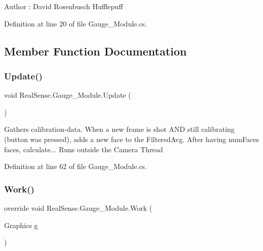 \begin{DoxyAuthor}{Author}
\+: David Rosenbusch  Hufflepuff 
\end{DoxyAuthor}


Definition at line 20 of file Gauge\+\_\+\+Module.\+cs.



\subsection{Member Function Documentation}
\mbox{\label{class_real_sense_1_1_gauge___module_a367111d614ea2a05af81e93a3b957cd4}} 
\subsubsection{\texorpdfstring{Update()}{Update()}}
{\footnotesize\ttfamily void Real\+Sense.\+Gauge\+\_\+\+Module.\+Update (\begin{DoxyParamCaption}{ }\end{DoxyParamCaption})}

Gathers calibration-\/data. When a new frame is shot A\+ND still calibrating (button was pressed), adds a new face to the Filtered\+Avg. After having num\+Faces faces, calculate... Runs outside the Camera Thread 

Definition at line 62 of file Gauge\+\_\+\+Module.\+cs.

\mbox{\label{class_real_sense_1_1_gauge___module_a587ea68ad539f2f56bcfbd7641a92a83}} 
\subsubsection{\texorpdfstring{Work()}{Work()}}
{\footnotesize\ttfamily override void Real\+Sense.\+Gauge\+\_\+\+Module.\+Work (\begin{DoxyParamCaption}\item[{Graphics}]{g }\end{DoxyParamCaption})\hspace{0.3cm}{\ttfamily [virtual]}}

